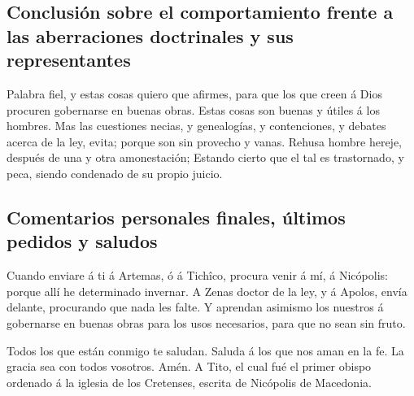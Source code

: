 \hypertarget{conclusiuxf3n-sobre-el-comportamiento-frente-a-las-aberraciones-doctrinales-y-sus-representantes}{%
\subsection{Conclusión sobre el comportamiento frente a las aberraciones
doctrinales y sus
representantes}\label{conclusiuxf3n-sobre-el-comportamiento-frente-a-las-aberraciones-doctrinales-y-sus-representantes}}

 Palabra fiel, y estas cosas quiero que afirmes, para que
los que creen á Dios procuren gobernarse en buenas obras. Estas cosas
son buenas y útiles á los hombres.  Mas las cuestiones
necias, y genealogías, y contenciones, y debates acerca de la ley,
evita; porque son sin provecho y vanas.  Rehusa hombre
hereje, después de una y otra amonestación;  Estando
cierto que el tal es trastornado, y peca, siendo condenado de su propio
juicio.

\hypertarget{comentarios-personales-finales-uxfaltimos-pedidos-y-saludos}{%
\subsection{Comentarios personales finales, últimos pedidos y
saludos}\label{comentarios-personales-finales-uxfaltimos-pedidos-y-saludos}}

 Cuando enviare á ti á Artemas, ó á Tichîco, procura
venir á mí, á Nicópolis: porque allí he determinado invernar.
 A Zenas doctor de la ley, y á Apolos, envía delante,
procurando que nada les falte.  Y aprendan asimismo los
nuestros á gobernarse en buenas obras para los usos necesarios, para que
no sean sin fruto.

 Todos los que están conmigo te saludan. Saluda á los que
nos aman en la fe. La gracia sea con todos vosotros. Amén. A Tito, el
cual fué el primer obispo ordenado á la iglesia de los Cretenses,
escrita de Nicópolis de Macedonia.

